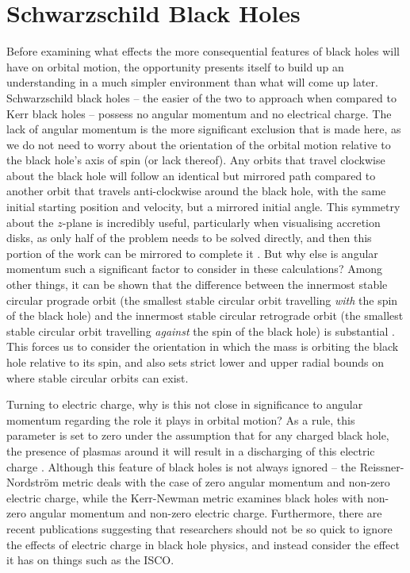 \section{Schwarzschild Black Holes}
Before examining what effects the more consequential features of black holes will have on orbital motion, the opportunity presents itself to build up an understanding in a much simpler environment than what will come up later.
Schwarzschild black holes -- the easier of the two to approach when compared to Kerr black holes -- possess no angular momentum and no electrical charge.
The lack of angular momentum is the more significant exclusion that is made here, as we do not need to worry about the orientation of the orbital motion relative to the black hole's axis of spin (or lack thereof).
Any orbits that travel clockwise about the black hole will follow an identical but mirrored path compared to another orbit that travels anti-clockwise around the black hole, with the same initial starting position and velocity, but a mirrored initial angle.
This symmetry about the $z$-plane is incredibly useful, particularly when visualising accretion disks, as only half of the problem needs to be solved directly, and then this portion of the work can be mirrored to complete it \cite{schwarzSymmetry}.
But why else is angular momentum such a significant factor to consider in these calculations?
Among other things, it can be shown that the difference between the innermost stable circular prograde orbit (the smallest stable circular orbit travelling \textit{with} the spin of the black hole) and the innermost stable circular retrograde orbit (the smallest stable circular orbit travelling \textit{against} the spin of the black hole) is substantial \cite{ISCOproret}.
This forces us to consider the orientation in which the mass is orbiting the black hole relative to its spin, and also sets strict lower and upper radial bounds on where stable circular orbits can exist. 

Turning to electric charge, why is this not close in significance to angular momentum regarding the role it plays in orbital motion?
As a rule, this parameter is set to zero under the assumption that for any charged black hole, the presence of plasmas around it will result in a discharging of this electric charge \cite{electricNegligence}.
Although this feature of black holes is not always ignored -- the Reissner-Nordstr{\"o}m metric deals with the case of zero angular momentum and non-zero electric charge, while the Kerr-Newman metric examines black holes with non-zero angular momentum and non-zero electric charge.
Furthermore, there are recent publications suggesting that researchers should not be so quick to ignore the effects of electric charge in black hole physics, and instead consider the effect it has on things such as the ISCO. \cite{electricNegligence}

